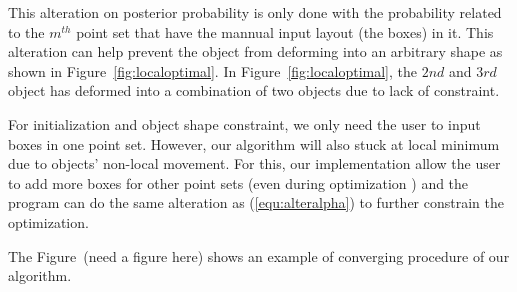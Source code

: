 This alteration on posterior probability is only done with the probability related to the $m^{th}$ point set that have the mannual input layout (the boxes) in it. This alteration can help prevent the object from deforming into an arbitrary shape as shown in Figure~\ref{fig:localoptimal}. In Figure~\ref{fig:localoptimal}, the $2nd$ and $3rd$ object has deformed into a combination of two objects due to lack of constraint.

For initialization and object shape constraint, we only need the user to input boxes in one point set. However, our algorithm will also stuck at local minimum due to objects' non-local movement. For this, our implementation allow the user to add more boxes for other point sets (even during optimization ) and the program can do the same alteration as (\ref{equ:alteralpha}) to further constrain the optimization.

The Figure~(need a figure here) shows an example of converging procedure of our algorithm. 
%
%
